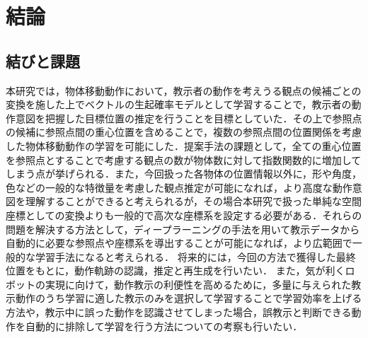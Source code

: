 ﻿%
\chapter{結論}

\section{結びと課題}

本研究では，物体移動動作において，教示者の動作を考えうる観点の候補ごとの変換を施した上でベクトルの生起確率モデルとして学習することで，教示者の動作意図を把握した目標位置の推定を行うことを目標としていた．その上で参照点の候補に参照点間の重心位置を含めることで，複数の参照点間の位置関係を考慮した物体移動動作の学習を可能にした．提案手法の課題として，全ての重心位置を参照点とすることで考慮する観点の数が物体数に対して指数関数的に増加してしまう点が挙げられる．また，今回扱った各物体の位置情報以外に，形や角度，色などの一般的な特徴量を考慮した観点推定が可能になれば，より高度な動作意図を理解することができると考えられるが，その場合本研究で扱った単純な空間座標としての変換よりも一般的で高次な座標系を設定する必要がある．それらの問題を解決する方法として，ディープラーニングの手法を用いて教示データから自動的に必要な参照点や座標系を導出することが可能になれば，より広範囲で一般的な学習手法になると考えられる．
将来的には，今回の方法で獲得した最終位置をもとに，動作軌跡の認識，推定と再生成を行いたい．
また，気が利くロボットの実現に向けて，動作教示の利便性を高めるために，多量に与えられた教示動作のうち学習に適した教示のみを選択して学習することで学習効率を上げる方法や，教示中に誤った動作を認識させてしまった場合，誤教示と判断できる動作を自動的に排除して学習を行う方法についての考察も行いたい．

